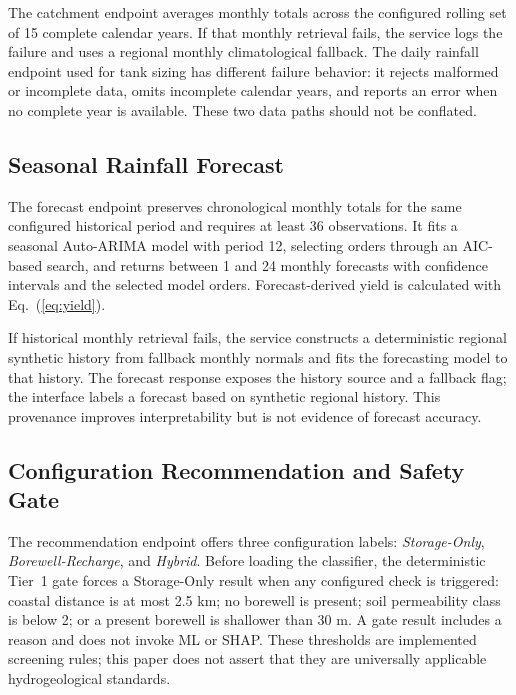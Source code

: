 \documentclass[conference]{IEEEtran}
\begin{document}
The catchment endpoint averages monthly totals across the configured
rolling set of 15 complete calendar years. If that monthly retrieval
fails, the service logs the failure and uses a regional monthly
climatological fallback. The daily rainfall endpoint used for tank sizing
has different failure behavior: it rejects malformed or incomplete
data, omits incomplete calendar years, and reports an error when no
complete year is available. These two data paths should not be conflated.

\subsection{Seasonal Rainfall Forecast}
\label{sec:forecast}

The forecast endpoint preserves chronological monthly totals for the
same configured historical period and requires at least 36 observations.
It fits a seasonal Auto-ARIMA model with period 12, selecting orders
through an AIC-based search, and returns between 1 and 24 monthly
forecasts with confidence intervals and the selected model orders.
Forecast-derived yield is calculated with Eq.~(\ref{eq:yield}).

If historical monthly retrieval fails, the service constructs a
deterministic regional synthetic history from fallback monthly normals
and fits the forecasting model to that history. The forecast response
exposes the history source and a fallback flag; the interface labels a
forecast based on synthetic regional history. This provenance improves
interpretability but is not evidence of forecast accuracy.

\subsection{Configuration Recommendation and Safety Gate}
\label{sec:classifier}

The recommendation endpoint offers three configuration labels:
\textit{Storage-Only}, \textit{Borewell-Recharge}, and \textit{Hybrid}.
Before loading the classifier, the deterministic Tier~1 gate forces a
Storage-Only result when any configured check is triggered: coastal
distance is at most 2.5 km; no borewell is present; soil permeability
class is below 2; or a present borewell is shallower than 30 m. A gate
result includes a reason and does not invoke ML or SHAP. These thresholds
are implemented screening rules; this paper does not assert that they
are universally applicable hydrogeological standards.
\end{document}

